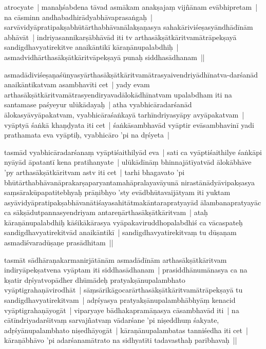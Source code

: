 \documentclass[article,a4paper]{memoir}
\begin{document}
	  \pstart atrocyate | manaḥśabdena tā\-vad asmā\-kam anakṣajaṃ vijñā\-nam evā\-bhipretam | na cā\-sminn andhabadhirā\-dyabhā\-vaprasaṅgaḥ | sarvā\-vidyā\-pratipakṣabhū\-tā\-rthabhā\-vanā\-lakṣaṇasya sahakā\-riviśeṣasyā\-ndhā\-dī\-nā\-m abhā\-vā\-t | indriyasannikarṣā\-bhā\-vā\-d iti tv arthasā\-kṣā\-tkā\-ritvamā\-trā\-pekṣayā\- sandigdhavyatirekitve anaikā\-ntikī\- kā\-raṇā\-nupalabdhiḥ | asmadvidhā\-rthasā\-kṣā\-tkā\-ritvā\-pekṣayā\- punaḥ siddhasā\-dhanam || 
	\pend
      

	  \pstart asmadā\-diviśeṣaṇaśū\-nyasyā\-rthasā\-kṣā\-tkā\-ritvamā\-trasyaivendriyā\-dhī\-natva-darśanā\-d anaikā\-ntikatvam asambhavī\-ti cet | yady evam arthasā\-kṣā\-tkā\-ritvamā\-trasyendiryavadā\-lokā\-dhī\-natvam upalabdham iti na santamase paśyeyur ulū\-kā\-dayaḥ | atha vyabhicā\-radarśanā\-d ā\-lokasyā\-vyā\-pakatvam, vyabhicā\-raśaṅkayā\- tarhī\-ndriyasyā\-py avyā\-pakatvam | vyā\-ptyā\- śaṅkā\- khaṇḍyata iti cet | śaṅkā\-sambhavā\-d vyā\-ptir evā\-sambhavinī\- yadi prathamata eva vyā\-ptiḥ, vyabhicā\-ro 'pi na dṛśyeta | 
	\pend
      

	  \pstart tasmā\-d vyabhicā\-radarśanaṃ vyā\-ptiśaithilyā\-d eva | sati ca vyā\-ptiśaithilye śaṅkā\-pi nyā\-yā\-d ā\-patantī\- kena pratihanyate | ulū\-kā\-dī\-nā\-ṃ bhinnajā\-tī\-yatvā\-d ā\-lokā\-bhā\-ve 'py arthasā\-kṣā\-tkā\-ritvam astv iti cet | tarhi bhagavato 'pi bhū\-tā\-rthabhā\-vanā\-prakarṣaparyantamahā\-pralayavā\-yunā\- nirastā\-nā\-dyā\-vipakṣasya saṃsā\-rakū\-papatitebhyaḥ prā\-ṇibhyo 'sty evā\-dbhū\-tavaijā\-tyam iti yuktam asyā\-vidyā\-pratipakṣabhā\-vanā\-tiśayasahitā\-tmakā\-ntarapratyayā\-d ā\-lambanapratyayā\-c ca sā\-kṣā\-dutpannasyendriyam antareṇā\-rthasā\-kṣā\-tkā\-ritvam | ataḥ kā\-raṇā\-nupalabdhiḥ kā\-śikā\-kā\-rasya vyā\-pakaviruddhopalabdhiś ca vā\-caspateḥ sandigdhavyatirekitvā\-d anaikā\-ntikī\- | sandigdhavyatirekitvaṃ tu dū\-ṣaṇam asmadī\-śvaradū\-ṣaṇe prasā\-dhitam || 
	\pend
      

	  \pstart tasmā\-t sā\-dhā\-raṇakarmanirjā\-tā\-nā\-m asmadā\-dī\-nā\-m arthasā\-kṣā\-tkā\-ritvam indiryā\-pekṣatvena vyā\-ptam iti siddhasā\-dhanam | prasiddhā\-numā\-nasya ca na kṣatir dṛśyatvopā\-dher dhū\-mā\-deḥ pratyakṣā\-nupalambhato vyā\-ptigrahaṇā\-virodhā\-t | sā\-ṃsā\-rikā\-gocarā\-rthasā\-kṣā\-tkā\-ritvamā\-trā\-pekṣayā\- tu sandigdhavyatirekitvam | adṛśyasya pratyakṣā\-nupalambhā\-bhyā\-ṃ kenacid vyā\-ptigrahaṇā\-yogā\-t | viparyaye bā\-dhakapramā\-ṇasya cā\-sambhavā\-d iti | na cā\-tī\-ndriyadarśitvaṃ sarvajñatvaṃ vā\-darśane 'pi niṣeddhuṃ śakyate, adṛśyā\-nupalambhato niṣedhā\-yogā\-t | kā\-raṇā\-nupalambatas tanniśedha iti cet | kā\-raṇā\-bhā\-vo 'pi adarśanamā\-trato na sidhyatī\-ti tadavasthaḥ paribhavaḥ || 
	\pend
      
\end{document}
